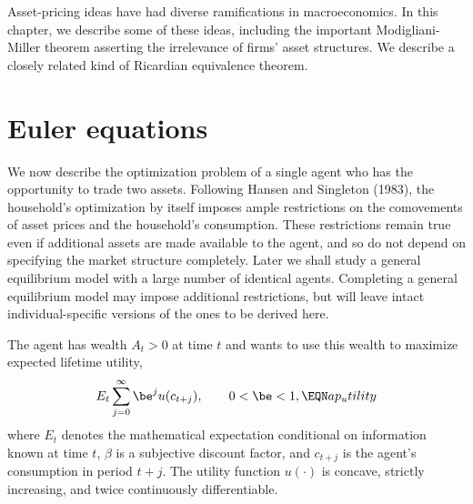 %
 Asset-pricing ideas have had diverse ramifications in macroeconomics.
In this chapter, we describe some of these ideas, including
the important Modigliani-Miller theorem asserting the irrelevance
of firms' asset structures.  We describe a closely related
kind of Ricardian equivalence theorem.

\section{Euler equations}

We now describe the optimization problem of a single agent who has the
opportunity to trade two assets.
 Following Hansen and Singleton (1983),
the household's optimization by itself imposes ample restrictions
on the comovements of asset prices and the household's consumption.
These restrictions remain true even if additional assets are
made available to the agent, and so do not depend on
specifying the market structure completely. Later we shall
study a general equilibrium model
with a large number of identical agents.
Completing a general equilibrium model may impose additional
restrictions, but will leave intact individual-specific
versions of  the ones to be derived here.
     

The agent has wealth $A_t > 0$ at time $t$ and wants to use
this wealth to maximize expected lifetime utility,
$$E_t\sum_{j=0}^\infty \be^j u(c_{t+j}),\qquad 0<\be <1,  \EQN ap_utility
$$
where $E_t$ denotes the mathematical expectation conditional on
information known at time $t$, $\beta$ is a subjective discount
factor, and $c_{t+j}$ is the agent's consumption in period $t+j$. The
utility function $u(\cdot)$ is concave, strictly increasing, and
twice continuously differentiable.

